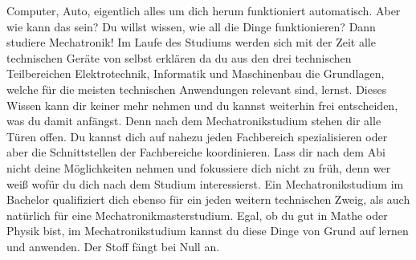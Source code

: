 \documentclass [11pt,letterpaper ,twoside ,openright ]{book}
\begin{document}
Computer, Auto, eigentlich alles um dich herum funktioniert automatisch. Aber wie kann das sein? Du willst wissen, wie all die Dinge funktionieren? Dann studiere Mechatronik! Im Laufe des Studiums werden sich mit der Zeit alle technischen Geräte von selbst erklären da du aus den drei technischen Teilbereichen Elektrotechnik, Informatik und Maschinenbau die Grundlagen, welche für die meisten technischen Anwendungen relevant sind, lernst. Dieses Wissen kann dir keiner mehr nehmen und du kannst weiterhin frei entscheiden, was du damit anfängst. Denn nach dem Mechatronikstudium stehen dir alle Türen offen. Du kannst dich auf nahezu jeden Fachbereich spezialisieren oder aber die Schnittstellen der Fachbereiche koordinieren. Lass dir nach dem Abi nicht deine Möglichkeiten nehmen und fokussiere dich nicht zu früh, denn wer weiß wofür du dich nach dem Studium interessierst. Ein Mechatronikstudium im Bachelor qualifiziert dich ebenso für ein jeden weitern technischen Zweig, als auch natürlich für eine Mechatronikmasterstudium. Egal, ob du gut in Mathe oder Physik bist, im Mechatronikstudium kannst du diese Dinge von Grund auf lernen und anwenden. Der Stoff fängt bei Null an.  
\end{document}
